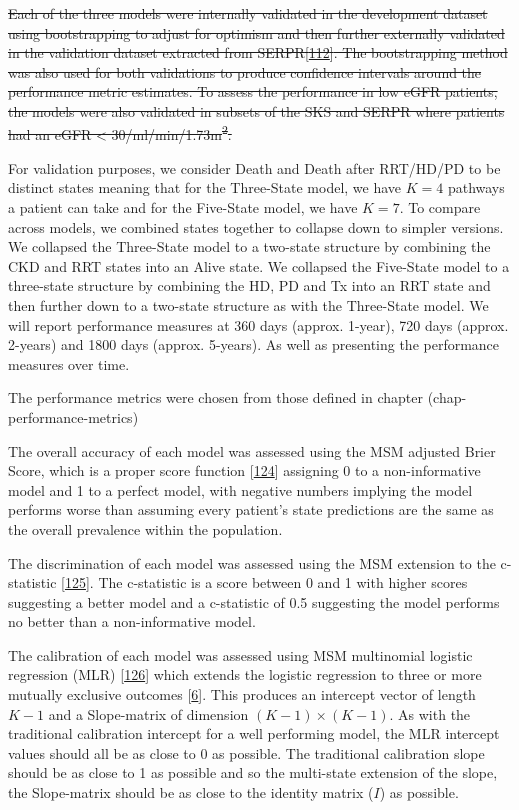 \documentclass[12pt,PhD,twoside,openright]{muthesis}
\begin{document}
\sout{Each of the three models were internally validated in the development dataset using bootstrapping to adjust for optimism and then further externally validated in the validation dataset extracted from SERPR{[}\protect\hyperlink{ref-schomaker_bootstrap_2018}{112}{]}. The bootstrapping method was also used for both validations to produce confidence intervals around the performance metric estimates. To assess the performance in low eGFR patients, the models were also validated in subsets of the SKS and SERPR where patients had an eGFR \textless{} 30/ml/min/1.73m\textsuperscript{2}.}

For validation purposes, we consider Death and Death after RRT/HD/PD to be distinct states meaning that for the Three-State model, we have \(K=4\) pathways a patient can take and for the Five-State model, we have \(K=7\). To compare across models, we combined states together to collapse down to simpler versions. We collapsed the Three-State model to a two-state structure by combining the CKD and RRT states into an Alive state. We collapsed the Five-State model to a three-state structure by combining the HD, PD and Tx into an RRT state and then further down to a two-state structure as with the Three-State model. We will report performance measures at 360 days (approx. 1-year), 720 days (approx. 2-years) and 1800 days (approx. 5-years). As well as presenting the performance measures over time.

The performance metrics were chosen from those defined in chapter (chap-performance-metrics)

The overall accuracy of each model was assessed using the MSM adjusted Brier Score, which is a proper score function {[}\protect\hyperlink{ref-gneiting_strictly_2007}{124}{]} assigning 0 to a non-informative model and 1 to a perfect model, with negative numbers implying the model performs worse than assuming every patient's state predictions are the same as the overall prevalence within the population.

The discrimination of each model was assessed using the MSM extension to the c-statistic {[}\protect\hyperlink{ref-calster_extending_2012-1}{125}{]}. The c-statistic is a score between 0 and 1 with higher scores suggesting a better model and a c-statistic of 0.5 suggesting the model performs no better than a non-informative model.

The calibration of each model was assessed using MSM multinomial logistic regression (MLR) {[}\protect\hyperlink{ref-hoorde_assessing_2014}{126}{]} which extends the logistic regression to three or more mutually exclusive outcomes {[}\protect\hyperlink{ref-riley_prognosis_2019}{6}{]}. This produces an intercept vector of length \(K-1\) and a Slope-matrix of dimension \((K-1) \times (K-1)\). As with the traditional calibration intercept for a well performing model, the MLR intercept values should all be as close to 0 as possible. The traditional calibration slope should be as close to 1 as possible and so the multi-state extension of the slope, the Slope-matrix should be as close to the identity matrix (\(I\)) as possible.
\end{document}
